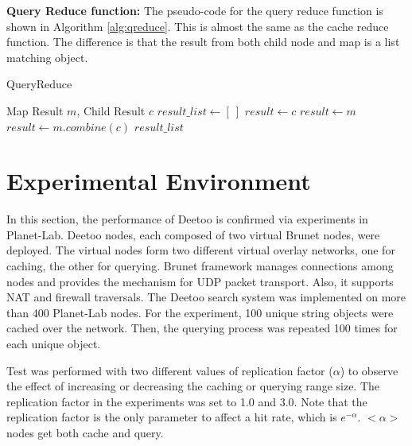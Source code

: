 \documentclass[9.5pt,journal,final,finalsubmission,twocolumn]{IEEEtran}
\begin{document}
\textbf{Query Reduce function:}  The pseudo-code for the  query reduce 
function
is shown in Algorithm \ref{alg:qreduce}. This is almost the same as the cache
reduce function. The difference is that the result from both child node 
and map is a list matching object. 
\begin{algorithm}
\caption{QueryReduce}
\label{alg:qreduce}
\begin{algorithmic}[1]
\REQUIRE Map Result $m$,  
\REQUIRE Child Result $c$ 
\STATE $result\_list \leftarrow [~]$
  \STATE $result \leftarrow c$
  \STATE $result \leftarrow m$
\ELSE
  \STATE $result \leftarrow m.combine(c)$
\ENDIF
\RETURN $result\_list$
\end{algorithmic}
\end{algorithm}

\section{Experimental Environment}
In this section, the performance of Deetoo is confirmed via experiments 
in Planet-Lab.
Deetoo nodes, each composed of two virtual Brunet nodes,
were deployed.
The virtual nodes form two 
different virtual overlay networks, one for caching, the other for 
querying.
Brunet framework manages connections among nodes and provides the mechanism 
for UDP packet transport. Also, it supports NAT and firewall traversals.
The Deetoo search system was implemented on more than 400 Planet-Lab nodes. 
For the experiment, 100 unique string objects were cached over 
the network. Then, 
the querying process was repeated 100 times for each unique object. 

Test was performed with two different values of replication factor 
($\alpha$) to observe the effect of increasing or decreasing the caching or 
querying range size. 
The replication factor in the experiments was set to 1.0 and 3.0.
Note that the replication factor is the only parameter to affect 
a hit rate, which is $e^{-\alpha}$. $<\alpha>$ nodes get both cache and 
query.
\end{document}
